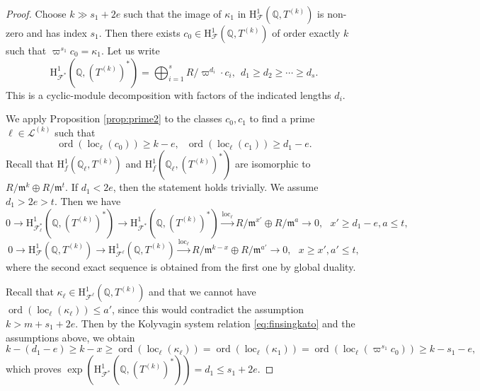 \documentclass[10pt,a4paper]{amsart}
\DeclareMathOperator{\loc}{loc}
\DeclareMathOperator{\ord}{ord}
\newcommand{\Fcal}{\mathcal{F}}
\newcommand{\Q}{\mathbb{Q}}
\newcommand{\cL}{\mathcal{L}}
\newcommand{\fm}{\mathfrak{m}}
\newcommand{\rH}{\mathrm{H}}
\begin{document}
\begin{proof}
Choose $k\gg s_1+2e$ such that the image of $\kappa_1$ in $\rH^1_{\Fcal}(\Q,T^{(k)})$ is non-zero and has index $s_1$. Then there exists $c_0\in\rH^1_{\Fcal}(\Q,T^{(k)})$ of order exactly $k$ such that $\varpi^{s_1}c_0 = \kappa_1$. 
Let us write
\[
\rH^1_{\Fcal^*}(\Q,(T^{(k)})^*)=\bigoplus_{i=1}^{s} R/\varpi^{d_i}\cdot c_i, \ \ d_1\geq d_2 \geq \cdots \geq d_s.
\]
This is a cyclic-module decomposition with factors of the indicated lengths $d_i$. 

We apply Proposition \ref{prop:prime2} to the classes $c_0, c_1$ to find a prime $\ell \in \cL^{(k)}$ such that
\[
\ord(\loc_{\ell}(c_0))\geq k-e, \ \ \ \ord(\loc_{\ell}(c_1))\geq d_1-e.
\]
Recall that $\rH^1_f(\Q_{\ell},T^{(k)})$ and $\rH^1_f(\Q_{\ell}, (T^{(k)})^*)$ are isomorphic to $R/\fm^k\oplus R/\fm^t$. If $d_1<2e$, then the statement holds trivially. We assume $d_1>2e>t$. Then we have
\[
0\to \rH^1_{\Fcal^*_{\ell}}(\Q,(T^{(k)})^*) \to \rH^1_{\Fcal^*}(\Q,(T^{(k)})^*) \xrightarrow{\loc_\ell} R/\fm^{x'}\oplus R/\fm^a \to 0, \ \ \ x'\geq d_1-e, a\leq t,
\]
\[
0\to \rH^1_{\Fcal}(\Q,T^{(k)}) \to \rH^1_{\Fcal^{\ell}}(\Q,T^{(k)}) \xrightarrow{\loc_\ell} R/\fm^{k-x} \oplus R/\fm^{a'}\to 0, \ \ \ x\geq x', a'\leq t,
\]
where the second exact sequence is obtained from the first one by global duality. 

Recall that $\kappa_\ell \in \rH^1_{\Fcal^{\ell}}(\Q,T^{(k)})$ and that we cannot have $\ord(\loc_{\ell}(\kappa_\ell))\leq a'$, 
since this would contradict the assumption $k > m+s_1+2e$. Then by the Kolyvagin system relation \eqref{eq:finsingkato} and the assumptions above, we obtain
\[
k-(d_1 -e)\geq k-x\geq \ord(\loc_{\ell}(\kappa_\ell))=\ord(\loc_{\ell}(\kappa_1))=\ord(\loc_{\ell}(\varpi^{s_1}c_0))\geq k-s_1-e,
\]
which proves $\operatorname{exp}(\rH^1_{\Fcal^*}(\Q,(T^{(k)})^*))=d_1 \leq s_1+2e$. 
\end{proof}
\end{document}

